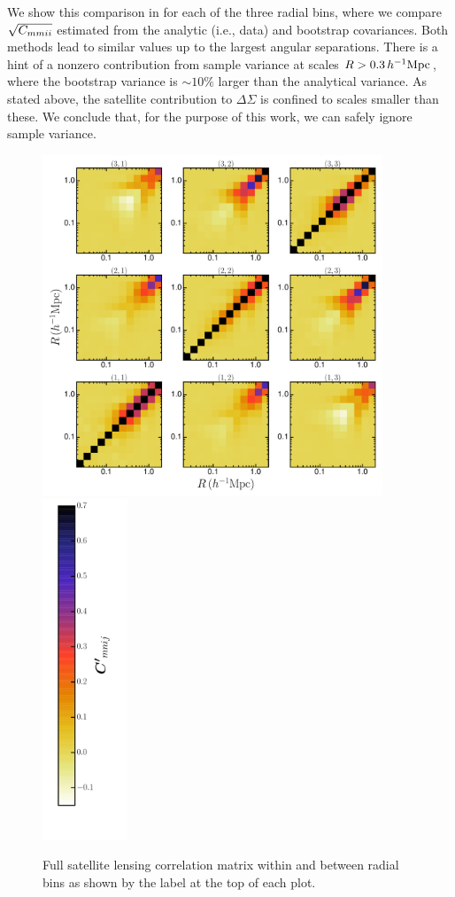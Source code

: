 We show this comparison in  for each of the three radial bins, where we 
compare $\sqrt{C_{mmii}}$ estimated from the analytic (i.e., data) and bootstrap 
covariances. Both methods lead to similar values up to the largest angular separations. There is 
a hint of a nonzero contribution from sample variance at scales $R>0.3\,h^{-1}{\rm Mpc}$, where the 
bootstrap variance is $\sim10\%$ larger than the analytical variance. As stated above, the 
satellite contribution to $\Delta\Sigma$ is confined to scales smaller than these. We conclude that, for the purpose of this work, we can safely ignore sample variance.

\begin{figure}
 \centerline{\includegraphics[height=4in]{chapter5/corr.pdf}
             \includegraphics[height=4in]{chapter5/corr_cbar.pdf}}
\caption{Full satellite lensing correlation matrix within and between radial bins as 
shown by the label at the top of each plot.}
\label{f:cov}
\end{figure}

